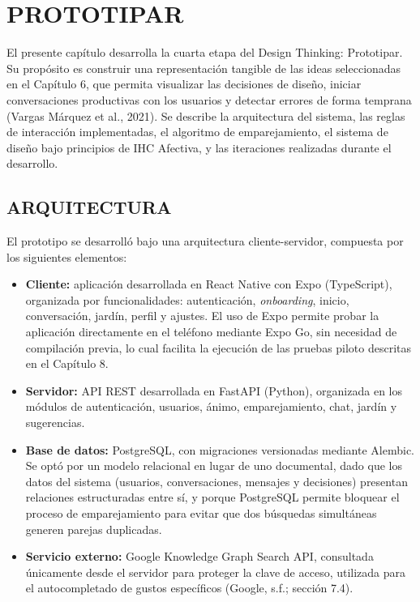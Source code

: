 \chapter{PROTOTIPAR}
El presente capítulo desarrolla la cuarta etapa del Design Thinking: Prototipar. Su propósito es construir una representación tangible de las ideas seleccionadas en el Capítulo 6, que permita visualizar las decisiones de diseño, iniciar conversaciones productivas con los usuarios y detectar errores de forma temprana (Vargas Márquez et al., 2021). Se describe la arquitectura del sistema, las reglas de interacción implementadas, el algoritmo de emparejamiento, el sistema de diseño bajo principios de IHC Afectiva, y las iteraciones realizadas durante el desarrollo.


\section{ARQUITECTURA}
El prototipo se desarrolló bajo una arquitectura cliente-servidor, compuesta por los siguientes elementos:

\begin{itemize}
    \item \textbf{Cliente:} aplicación desarrollada en React Native con Expo (TypeScript), organizada por funcionalidades: autenticación, \textit{onboarding}, inicio, conversación, jardín, perfil y ajustes. El uso de Expo permite probar la aplicación directamente en el teléfono mediante Expo Go, sin necesidad de compilación previa, lo cual facilita la ejecución de las pruebas piloto descritas en el Capítulo 8.
    \item \textbf{Servidor:} API REST desarrollada en FastAPI (Python), organizada en los módulos de autenticación, usuarios, ánimo, emparejamiento, chat, jardín y sugerencias.
    \item \textbf{Base de datos:} PostgreSQL, con migraciones versionadas mediante Alembic. Se optó por un modelo relacional en lugar de uno documental, dado que los datos del sistema (usuarios, conversaciones, mensajes y decisiones) presentan relaciones estructuradas entre sí, y porque PostgreSQL permite bloquear el proceso de emparejamiento para evitar que dos búsquedas simultáneas generen parejas duplicadas.
    \item \textbf{Servicio externo:} Google Knowledge Graph Search API, consultada únicamente desde el servidor para proteger la clave de acceso, utilizada para el autocompletado de gustos específicos (Google, s.f.; sección 7.4).
\end{itemize}

